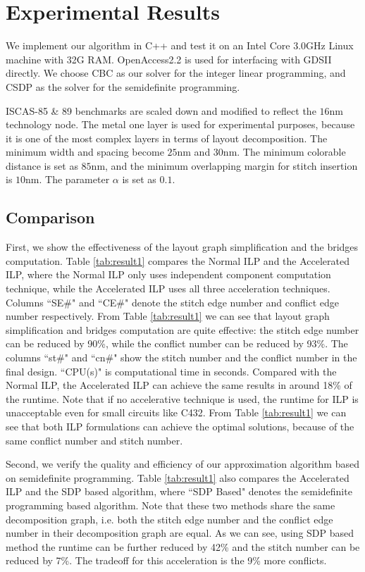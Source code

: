 \documentclass[10pt,conference]{IEEEtran}
\begin{document}
 \section{Experimental Results}
\label{chap:result}

We implement our algorithm in C++ and test it on an Intel Core 3.0GHz Linux machine with 32G RAM.
OpenAccess2.2 \cite{OpenAccess} is used for interfacing with GDSII directly.
We choose CBC \cite{cbc} as our solver for the integer linear programming, and CSDP \cite{CSDP} as the solver for the semidefinite programming.

ISCAS-85 \& 89 benchmarks are scaled down and modified to reflect the $16$nm technology node.
The metal one layer is used for experimental purposes, because it is one of the most complex layers in terms of layout decomposition.
The minimum width and spacing become $25$nm and $30$nm.
The minimum colorable distance is set as $85$nm, and the minimum overlapping margin for stitch insertion is $10$nm.
The parameter $\alpha$ is set as $0.1$.




\subsection{Comparison}

First, we show the effectiveness of the layout graph simplification and the bridges computation.
Table \ref{tab:result1} compares the Normal ILP and the Accelerated ILP, where the Normal ILP only uses independent component computation technique, while the Accelerated ILP uses all three acceleration techniques.
Columns ``SE\#" and ``CE\#" denote the stitch edge number and conflict edge number respectively.
From Table \ref{tab:result1} we can see that layout graph simplification and bridges computation are quite effective:
the stitch edge number can be reduced by 90\%, while the conflict number can be reduced by 93\%.
The columns ``st\#" and  ``cn\#" show the stitch number and the conflict number in the final design.
``CPU(s)" is computational time in seconds.
Compared with the Normal ILP, the Accelerated ILP can achieve the same results in around 18\% of the runtime.
Note that if no accelerative technique is used, the runtime for ILP is unacceptable even for small circuits like C432. 
From Table \ref{tab:result1} we can see that both ILP formulations can achieve the optimal solutions, because of the same conflict number and stitch number. 

Second, we verify the quality and efficiency of our approximation algorithm based on semidefinite programming.
Table \ref{tab:result1} also compares the Accelerated ILP and the SDP based algorithm, where ``SDP Based" denotes the semidefinite programming based algorithm.
Note that these two methods share the same decomposition graph, i.e. both the stitch edge number and the conflict edge number in their decomposition graph are equal.
As we can see, using SDP based method the runtime can be further reduced by 42\% and the stitch number can be reduced by 7\%.
The tradeoff for this acceleration is the 9\% more conflicts.
\end{document}
